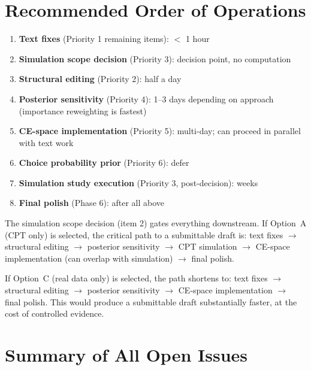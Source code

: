 \documentclass[12pt,a4paper]{article}
\begin{document}
\section{Recommended Order of Operations}

\begin{enumerate}
  \item \textbf{Text fixes} (Priority 1 remaining items): $<$ 1 hour
  \item \textbf{Simulation scope decision} (Priority 3): decision point,
    no computation
  \item \textbf{Structural editing} (Priority 2): half a day
  \item \textbf{Posterior sensitivity} (Priority 4): 1--3 days depending on
    approach (importance reweighting is fastest)
  \item \textbf{CE-space implementation} (Priority 5): multi-day; can proceed
    in parallel with text work
  \item \textbf{Choice probability prior} (Priority 6): defer
  \item \textbf{Simulation study execution} (Priority 3, post-decision): weeks
  \item \textbf{Final polish} (Phase 6): after all above
\end{enumerate}

The simulation scope decision (item 2) gates everything downstream. If
Option~A (CPT only) is selected, the critical path to a submittable draft is:
text fixes $\to$ structural editing $\to$ posterior sensitivity $\to$ CPT
simulation $\to$ CE-space implementation (can overlap with simulation) $\to$
final polish.

If Option~C (real data only) is selected, the path shortens to: text fixes
$\to$ structural editing $\to$ posterior sensitivity $\to$ CE-space
implementation $\to$ final polish. This would produce a submittable draft
substantially faster, at the cost of controlled evidence.


\section{Summary of All Open Issues}
\end{document}
